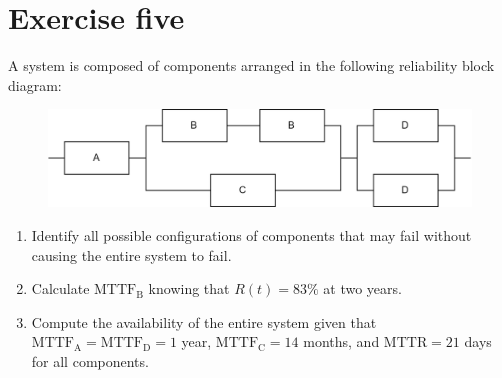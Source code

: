 \section{Exercise five}

A system is composed of components arranged in the following reliability block diagram:
\begin{figure}[H]
    \centering
    \includegraphics[width=0.7\linewidth]{images/rbd2.png}
\end{figure}
\begin{enumerate}
    \item Identify all possible configurations of components that may fail without causing the entire system to fail.
    \item Calculate $\text{MTTF}_\text{B}$ knowing that $R(t) = 83\%$ at two years.
    \item Compute the availability of the entire system given that $\text{MTTF}_\text{A}=\text{MTTF}_\text{D}=1$ year, $\text{MTTF}_\text{C} = 14$ months, and $\text{MTTR}=21$ days for all components.
\end{enumerate}

